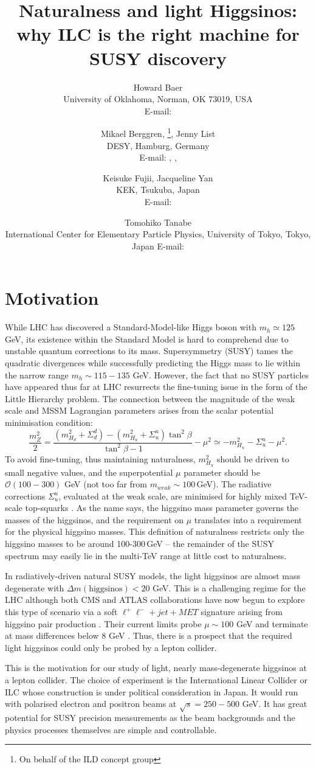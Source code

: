 \documentclass{PoS}
\title{Naturalness and light Higgsinos: why ILC is the right machine for SUSY discovery}
\author{Howard Baer \\%
        University of Oklahoma,
        Norman, OK 73019, USA \\
        E-mail: \email{baer@ou.edu}}
\author{Mikael Berggren, \speaker{Suvi-Leena Lehtinen}\thanks{On behalf of the ILD concept group},
                Jenny List\\
     DESY, Hamburg, Germany\\
     E-mail:  \email{mikael.berggren@desy.de}, \email{suvi-leena.lehtinen@desy.de},
     \email{jenny.list@desy.de}}
\author{Keisuke Fujii, Jacqueline Yan\\
        KEK,        Tsukuba, Japan \\
        E-mail: \email{keisuke.fujii@kek.pj, jackie@post.kek.jp}}
\author{Tomohiko Tanabe\\
        International Center for Elementary Particle Physics, University of Tokyo,
        Tokyo, Japan
        E-mail: \email{tomohiko@icepp.s.u-tokyo.ac.jp}}
\begin{document}
\section{Motivation}

While LHC has discovered a Standard-Model-like Higgs boson with $m_h\simeq 125$ GeV, its 
existence within the Standard Model is hard to comprehend due to unstable quantum corrections to its mass.
Supersymmetry (SUSY) tames the quadratic divergences while successfully predicting the Higgs mass to lie
within the narrow range $m_h\sim 115-135$ GeV. 
However, the fact that no SUSY particles have appeared thus far at LHC resurrects the fine-tuning issue in the
form of the Little Hierarchy problem. 
The connection between the magnitude of the weak scale 
and MSSM Lagrangian
parameters arises from the scalar potential minimisation condition:
\begin{equation}
 \frac{m^2_Z}{2} = \frac{(m^2_{H_d}+ \Sigma_d^d) - (m^2_{H_u}+\Sigma_u^u)\tan^2 \beta}{\tan^2\beta -1}-\mu^2
\simeq -m_{H_u}^2-\Sigma_u^u-\mu^2.
\end{equation}
To avoid fine-tuning, thus maintaining naturalness, $m_{H_u}^2$ should be driven to small negative values, 
and the superpotential $\mu$ parameter should be $\mathcal{O}(100-300)$ GeV (not too far from $m_{weak}\sim 100$\,GeV). 
The radiative corrections $\Sigma_u^u$, evaluated at the weak scale, are minimised for highly mixed TeV-scale
top-squarks
\cite{Baer:2012up}.
As the name says, the higgsino mass parameter governs the masses of the higgsinos, 
and the requirement on $\mu$ translates into a requirement for the physical higgsino masses. 
This definition of naturalness restricts only the higgsino masses to be around 100-300\,GeV -- 
the remainder of the SUSY spectrum may easily lie in the multi-TeV range at little cost to naturalness.


In radiatively-driven natural SUSY models, the light higgsinos are almost mass degenerate with 
$\Delta m(\text{higgsinos})<20$ GeV. 
This is a challenging regime for the LHC although both CMS and ATLAS collaborations 
have now begun to explore this type of scenario via a soft $\ell^+\ell^- +jet+MET$ signature
arising from higgsino pair production \cite{Baer:2014kya}.
Their current limits probe $\mu\sim 100$ GeV and terminate at mass differences below 8 GeV \cite{CMS:2017fij}. 
Thus, there is a prospect that the required light higgsinos could only be probed by a lepton collider.

This is the motivation for our study of light, nearly mass-degenerate higgsinos at a lepton collider. 
The choice of experiment is the International Linear Collider or ILC whose construction is under 
political consideration in Japan. 
It would run with polarised electron and positron beams at $\sqrt{s}=250-500$ GeV. 
It has great potential for SUSY precision measurements as the beam backgrounds and the 
physics processes themselves are simple and controllable.
\end{document}
